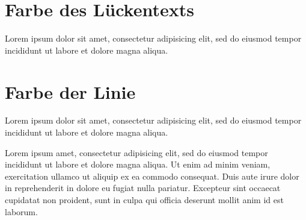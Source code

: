 \documentclass{article}
\begin{document}
\section{Farbe des Lückentexts}


\textcolor{clozetextcolor}{Lorem ipsum dolor sit amet, consectetur
adipisicing elit, sed do eiusmod tempor incididunt ut labore et dolore
magna aliqua.}

\section{Farbe der Linie}


\textcolor{clozelinecolor}{Lorem ipsum dolor sit amet, consectetur
adipisicing elit, sed do eiusmod tempor incididunt ut labore et dolore
magna aliqua.}

\vspace{3cm}

Lorem ipsum  amet, consectetur adipisicing elit, sed do
eiusmod tempor incididunt ut labore et dolore magna aliqua. Ut enim ad
minim veniam,  exercitation ullamco  ut aliquip ex ea commodo consequat. Duis aute irure dolor in
reprehenderit in  dolore eu fugiat
nulla pariatur. Excepteur sint occaecat cupidatat non proident, sunt in
culpa qui officia deserunt mollit anim id est laborum.
\end{document}
